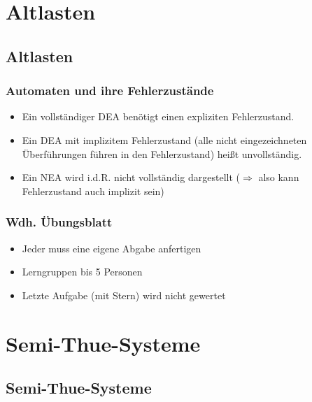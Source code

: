 



\section{Altlasten}
\subsection{Altlasten}

\begin{frame}
\frametitle{Automaten und ihre Fehlerzustände}
\begin{itemize}
	\item Ein vollständiger DEA benötigt einen expliziten Fehlerzustand.
	\item Ein DEA mit implizitem Fehlerzustand (alle nicht eingezeichneten Überführungen führen in den Fehlerzustand) heißt unvollständig.
	\item Ein NEA wird i.d.R. nicht vollständig dargestellt ($\Rightarrow$ also kann Fehlerzustand auch implizit sein)
\end{itemize}
\end{frame}

\begin{frame}
\frametitle{Wdh. Übungsblatt}
\begin{itemize}
	\item Jeder muss eine eigene Abgabe anfertigen
	\item Lerngruppen bis 5 Personen
	\item Letzte Aufgabe (mit Stern) wird nicht gewertet
\end{itemize}
\end{frame}

\section{Semi-Thue-Systeme}
\subsection{Semi-Thue-Systeme}

